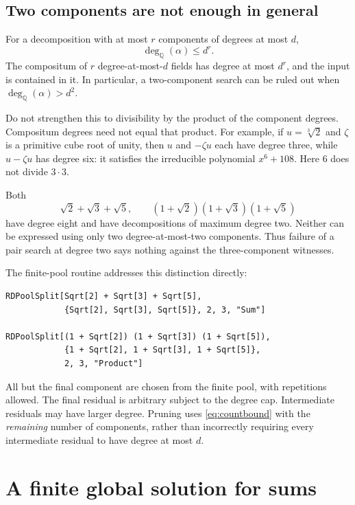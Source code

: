 \documentclass[11pt,letterpaper]{article}
\theoremstyle{definition}
\newcommand{\Q}{\mathbb Q}
\newcommand{\dq}{\deg_{\Q}}
\begin{document}
\subsection{Two components are not enough in general}
For a decomposition with at most $r$ components of degrees at most $d$,
\begin{equation}\label{eq:countbound}
 \dq(\alpha)\le d^r.
\end{equation}
The compositum of $r$ degree-at-most-$d$ fields has degree at most $d^r$, and the input is contained in it. In particular, a two-component search can be ruled out when $\dq(\alpha)>d^2$.

Do not strengthen this to divisibility by the product of the component degrees. Compositum degrees need not equal that product. For example, if $u=\sqrt[3]{2}$ and $\zeta$ is a primitive cube root of unity, then $u$ and $-\zeta u$ each have degree three, while $u-\zeta u$ has degree six: it satisfies the irreducible polynomial $x^6+108$. Here $6$ does not divide $3\cdot3$.

Both
\[
 \sqrt2+\sqrt3+\sqrt5,
 \qquad (1+\sqrt2)(1+\sqrt3)(1+\sqrt5)
\]
have degree eight and have decompositions of maximum degree two. Neither can be expressed using only two degree-at-most-two components. Thus failure of a pair search at degree two says nothing against the three-component witnesses.

The finite-pool routine addresses this distinction directly:
\begin{samepage}
\begin{lstlisting}
RDPoolSplit[Sqrt[2] + Sqrt[3] + Sqrt[5],
            {Sqrt[2], Sqrt[3], Sqrt[5]}, 2, 3, "Sum"]

RDPoolSplit[(1 + Sqrt[2]) (1 + Sqrt[3]) (1 + Sqrt[5]),
            {1 + Sqrt[2], 1 + Sqrt[3], 1 + Sqrt[5]},
            2, 3, "Product"]
\end{lstlisting}
\end{samepage}
All but the final component are chosen from the finite pool, with repetitions allowed. The final residual is arbitrary subject to the degree cap. Intermediate residuals may have larger degree. Pruning uses \eqref{eq:countbound} with the \emph{remaining} number of components, rather than incorrectly requiring every intermediate residual to have degree at most $d$.

\section{A finite global solution for sums}
\end{document}
